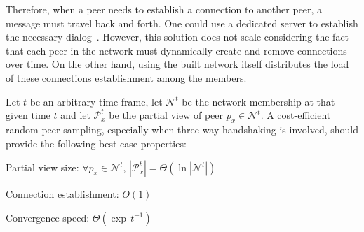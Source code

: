 Therefore, when a peer needs to establish a connection to another
peer, a message must travel back and forth. One could use a dedicated
server to establish the necessary dialog~\cite{peerjs}. However, this
solution does not scale considering the fact that each peer in the
network must dynamically create and remove connections over time. On
the other hand, using the built network itself distributes the load of
these connections establishment among the members.


\begin{problem}
  Let $t$ be an arbitrary time frame, let $\mathcal{N}^t$ be the network
  membership at that given time $t$ and let $\mathcal{P}_x^t$ be the partial
  view of peer $p_x \in \mathcal{N}^t$.  A cost-efficient random peer sampling,
  especially when three-way handshaking is involved, should provide the
  following best-case properties:
  \begin{center}
    Partial view size: \hfill
    $\forall p_x \in \mathcal{N}^t,\, |\mathcal{P}_x^t| = \Theta (\ln
    |\mathcal{N}^t|)$
  \end{center}
  \begin{center}
    Connection establishment: \hfill $O(1)$
  \end{center}
  \begin{center}
    Convergence speed: \hfill $\Theta(\exp \, t^{-1})$
  \end{center}
\end{problem}

